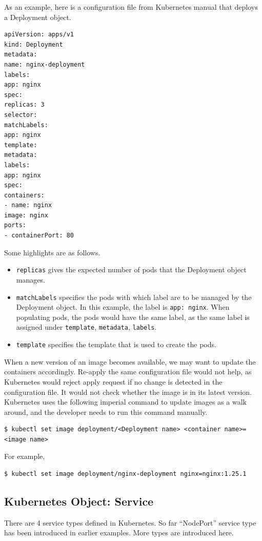 As an example, here is a configuration file from Kubernetes manual that deploys a Deployment object.
\begin{lstlisting}
apiVersion: apps/v1
kind: Deployment
metadata:
name: nginx-deployment
labels:
app: nginx
spec:
replicas: 3
selector:
matchLabels:
app: nginx
template:
metadata:
labels:
app: nginx
spec:
containers:
- name: nginx
image: nginx
ports:
- containerPort: 80
\end{lstlisting}
Some highlights are as follows.
\begin{itemize}
	\item \verb|replicas| gives the expected number of pods that the Deployment object manages.
	\item \verb|matchLabels| specifies the pods with which label are to be managed by the Deployment object. In this example, the label is \verb|app: nginx|. When populating pods, the pods would have the same label, as the same label is assigned under \verb|template|, \verb|metadata|, \verb|labels|.
	\item \verb|template| specifies the template that is used to create the pods.
\end{itemize}

When a new version of an image becomes available, we may want to update the containers accordingly. Re-apply the same configuration file would not help, as Kubernetes would reject apply request if no change is detected in the configuration file. It would not check whether the image is in its latest version. Kubernetes uses the following imperial command to update images as a walk around, and the developer needs to run this command manually.
\begin{lstlisting}
$ kubectl set image deployment/<Deployment name> <container name>=<image name>
\end{lstlisting}
For example,
\begin{lstlisting}
$ kubectl set image deployment/nginx-deployment nginx=nginx:1.25.1
\end{lstlisting}

\subsection{Kubernetes Object: Service} \label{ch:vac:subsec:k8snetworking}

There are 4 service types defined in Kubernetes. So far ``NodePort'' service type has been introduced in earlier examples. More types are introduced here.

